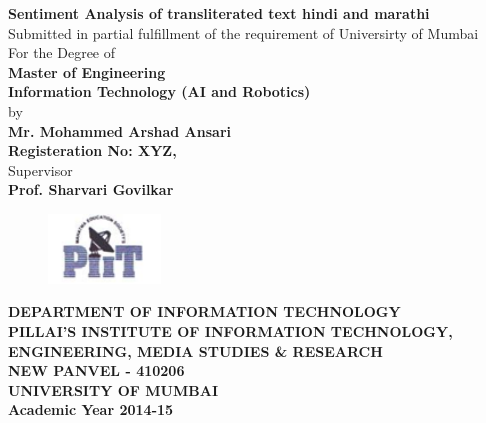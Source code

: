 \documentclass[12pt]{book}
\begin{document}
\thispagestyle{empty}

\begin{center}
  	\fontsize{20}{30}\selectfont \textbf{Sentiment Analysis of transliterated
        text hindi and marathi}\\
  	\fontsize{14}{24}\selectfont Submitted in partial fulfillment of the requirement of Universirty of Mumbai\\For the Degree of\\
  	\fontsize{16}{30}\selectfont \textbf{Master of Engineering}\\
  	\fontsize{14}{30}\selectfont \textbf{Information Technology (AI and Robotics)} \\
  	by\\
  	\textbf{Mr. Mohammed Arshad Ansari}\\
  	\textbf{Registeration No: XYZ,}\\
  	Supervisor\\
  	\textbf{Prof. Sharvari Govilkar}\\
	\vspace{30mm}
	\begin{figure}[ht!]
	  \centering
	  \includegraphics[width=30mm]{piit.png}
	\end{figure}
  	\fontsize{14}{20}\selectfont \textbf{DEPARTMENT OF INFORMATION TECHNOLOGY\\PILLAI'S INSTITUTE OF INFORMATION TECHNOLOGY,\\
	ENGINEERING, MEDIA STUDIES \& RESEARCH\\ NEW PANVEL - 410206\\UNIVERSITY OF MUMBAI\\Academic Year 2014-15}

\end{center}
\end{document}
